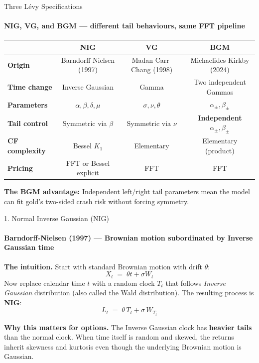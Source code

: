 \documentclass[aspectratio=169]{beamer}
\begin{document}
\begin{frame}{Three L\'evy Specifications}
\framesubtitle{NIG, VG, and BGM --- different tail behaviours, same FFT pipeline}
\footnotesize
\begin{center}
\begin{tabular}{@{}lccc@{}}\toprule
& \textbf{NIG} & \textbf{VG} & \textbf{BGM}\\
\midrule
\textbf{Origin} & Barndorff-Nielsen (1997) & Madan-Carr-Chang (1998) & Michaelides-Kirkby (2024)\\
\textbf{Time change} & Inverse Gaussian & Gamma & Two independent Gammas\\
\textbf{Parameters} & $\alpha, \beta, \delta, \mu$ & $\sigma, \nu, \theta$ & $\alpha_\pm, \beta_\pm$\\
\textbf{Tail control} & Symmetric via $\beta$ & Symmetric via $\nu$ & \textbf{Independent} $\alpha_\pm, \beta_\pm$\\
\textbf{CF complexity} & Bessel $K_1$ & Elementary & Elementary (product)\\
\textbf{Pricing} & FFT or Bessel explicit & FFT & FFT\\
\bottomrule
\end{tabular}
\end{center}

\vspace{0.3cm}
\textcolor{bbgorange}{\textbf{The BGM advantage:}} Independent left/right tail parameters mean the model can fit gold's two-sided crash risk without forcing symmetry.

\end{frame}

\begin{frame}{1. Normal Inverse Gaussian (NIG)}
\framesubtitle{Barndorff-Nielsen (1997) --- Brownian motion subordinated by Inverse Gaussian time}

\textbf{The intuition.} Start with standard Brownian motion with drift $\theta$:
\[
X_t \;=\; \theta t + \sigma W_t
\]
Now replace calendar time $t$ with a random clock $T_t$ that follows \emph{Inverse Gaussian} distribution (also called the Wald distribution). The resulting process is \textbf{NIG}:
\[
L_t \;=\; \theta\, T_t + \sigma\, W_{T_t}
\]

\vspace{0.2cm}
\textbf{Why this matters for options.} The Inverse Gaussian clock has \textbf{heavier tails} than the normal clock. When time itself is random and skewed, the returns inherit skewness and kurtosis even though the underlying Brownian motion is Gaussian.

\end{frame}
\end{document}
